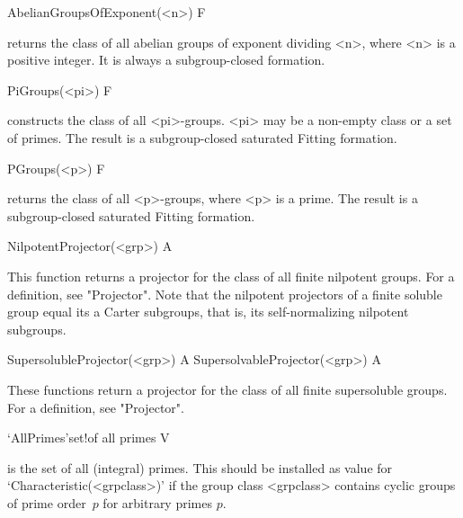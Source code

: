 \>AbelianGroupsOfExponent(<n>) F

\relax
{}\relax
{}\relax
returns the class of all abelian groups of exponent dividing <n>, 
where <n> is
a positive integer. It is always a subgroup-closed formation.


\>PiGroups(<pi>) F

\relax
constructs the class of all <pi>-groups.  <pi> may be a non-empty class or a
set of primes. The result is a subgroup-closed saturated Fitting formation.


\>PGroups(<p>) F

\relax
returns the class of all <p>-groups, where <p> is a prime.  The result is a
subgroup-closed saturated Fitting formation.

\null

\>NilpotentProjector(<grp>) A

\relax
This function returns a projector for the class of all finite nilpotent
groups. For a definition, see "Projector". Note that the nilpotent projectors
of a finite soluble group equal its a Carter subgroups, that is, its
self-normalizing nilpotent subgroups. 

\>SupersolubleProjector(<grp>) A
\>SupersolvableProjector(<grp>) A

These functions return a projector for the class of all finite supersoluble
groups. For a definition, see "Projector". 

\null

\>`AllPrimes'{set}!{of all primes} V

\relax
{}\relax
\label{AllPrimes}\relax
is the set of all (integral) primes. This should be
installed as value for `Characteristic(<grpclass>)' if the group class
<grpclass> contains cyclic groups of prime order~$p$ for arbitrary primes $p$.



